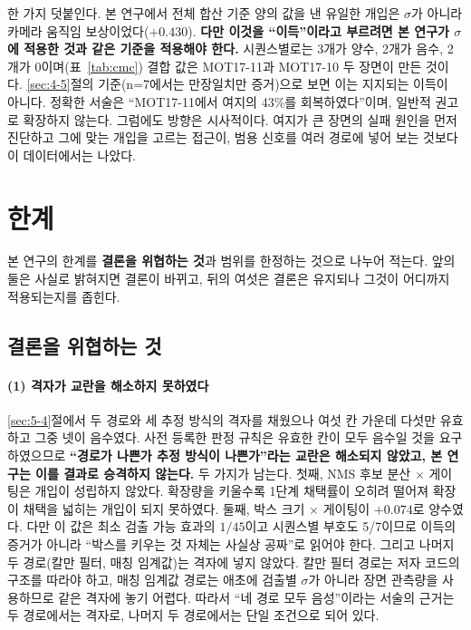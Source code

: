 \documentclass[12pt,a4paper,oneside]{report}
\begin{document}
한 가지 덧붙인다. 본 연구에서 전체 합산 기준 양의 값을 낸 유일한 개입은 $\sigma$가 아니라 카메라 움직임 보상이었다($+0.430$). \textbf{다만 이것을 ``이득''이라고 부르려면 본 연구가 $\sigma$에 적용한 것과 같은 기준을 적용해야 한다.} 시퀀스별로는 3개가 양수, 2개가 음수, 2개가 0이며(표~\ref{tab:cmc}) 결합 값은 MOT17-11과 MOT17-10 두 장면이 만든 것이다. \ref{sec:4-5}절의 기준(n=7에서는 만장일치만 증거)으로 보면 이는 지지되는 이득이 아니다. 정확한 서술은 ``MOT17-11에서 여지의 43\%를 회복하였다''이며, 일반적 권고로 확장하지 않는다. 그럼에도 방향은 시사적이다. 여지가 큰 장면의 실패 원인을 먼저 진단하고 그에 맞는 개입을 고르는 접근이, 범용 신호를 여러 경로에 넣어 보는 것보다 이 데이터에서는 나았다.

\section{한계}\label{sec:7-3}

본 연구의 한계를 \textbf{결론을 위협하는 것}과 범위를 한정하는 것으로 나누어 적는다. 앞의 둘은 사실로 밝혀지면 결론이 바뀌고, 뒤의 여섯은 결론은 유지되나 그것이 어디까지 적용되는지를 좁힌다.

\subsection*{결론을 위협하는 것}

\paragraph{(1) 격자가 교란을 해소하지 못하였다} \ref{sec:5-4}절에서 두 경로와 세 추정 방식의 격자를 채웠으나 여섯 칸 가운데 다섯만 유효하고 그중 넷이 음수였다. 사전 등록한 판정 규칙은 유효한 칸이 모두 음수일 것을 요구하였으므로 \textbf{``경로가 나쁜가 추정 방식이 나쁜가''라는 교란은 해소되지 않았고, 본 연구는 이를 결과로 승격하지 않는다.} 두 가지가 남는다. 첫째, NMS 후보 분산 $\times$ 게이팅은 개입이 성립하지 않았다. 확장량을 키울수록 1단계 채택률이 오히려 떨어져 확장이 채택을 넓히는 개입이 되지 못하였다. 둘째, 박스 크기 $\times$ 게이팅이 $+0.074$로 양수였다. 다만 이 값은 최소 검출 가능 효과의 $1/45$이고 시퀀스별 부호도 5/7이므로 이득의 증거가 아니라 ``박스를 키우는 것 자체는 사실상 공짜''로 읽어야 한다. 그리고 나머지 두 경로(칼만 필터, 매칭 임계값)는 격자에 넣지 않았다. 칼만 필터 경로는 저자 코드의 구조를 따라야 하고, 매칭 임계값 경로는 애초에 검출별 $\sigma$가 아니라 장면 관측량을 사용하므로 같은 격자에 놓기 어렵다. 따라서 ``네 경로 모두 음성''이라는 서술의 근거는 두 경로에서는 격자로, 나머지 두 경로에서는 단일 조건으로 되어 있다.
\end{document}
